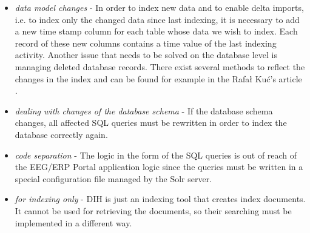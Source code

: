 \begin{itemize}

\item \textit{data model changes} - In order to index new data and to enable delta imports, i.e. to index only the changed data since last indexing, it is necessary to add a new time stamp column for each table whose data we wish to index. 
Each record of these new columns contains a time value of the last indexing activity.
Another issue that needs to be solved on the database level is managing deleted database records. There exist several methods to reflect the changes in the index and can be found for example in the Rafał Kuć's article \cite{Solr:DIHDelete}.

%

\item \textit{dealing with changes of the database schema} - If the database schema changes, all affected SQL queries must be rewritten in order to index the database correctly again. %

\item \textit{code separation} - The logic in the form of the SQL queries is out of reach of the EEG/ERP Portal application logic since the queries must be written in a special configuration file managed by the Solr server.

\item \textit{for indexing only} - DIH is just an indexing tool that creates index documents. It cannot be used for retrieving the documents, so their searching must be implemented in a different way.

\end{itemize}



